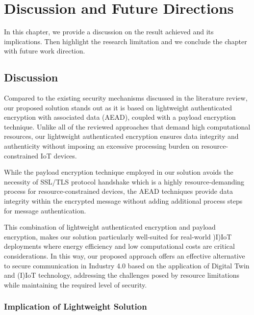 

\chapter{Discussion and Future Directions }
\label{Chapter5} %
In this chapter, we provide a discussion on the result achieved and its implications. Then highlight the research limitation and we conclude the chapter with future work direction. 

\section{Discussion}
Compared to the existing security mechanisms discussed in the literature review, our proposed solution stands out as it is based on lightweight authenticated encryption with associated data (AEAD), coupled with a payload encryption technique. Unlike all of the reviewed approaches that demand high computational resources, our lightweight authenticated encryption ensures data integrity and authenticity without imposing an excessive processing burden on resource-constrained IoT devices.

While the payload encryption technique employed in our solution avoids the necessity of SSL/TLS protocol handshake which is a highly resource-demanding process for resource-constrained devices, the AEAD techniques provide data integrity within the encrypted message without adding additional process steps for message authentication.

 This combination of lightweight authenticated encryption and payload encryption, makes our solution particularly well-suited for real-world )I)IoT deployments where energy efficiency and low computational costs are critical considerations. In this way, our proposed approach offers an effective alternative to secure communication in Industry 4.0 based on the application of Digital Twin and (I)IoT technology, addressing the challenges posed by resource limitations while maintaining the required level of security. 


\subsection{Implication of Lightweight Solution}

